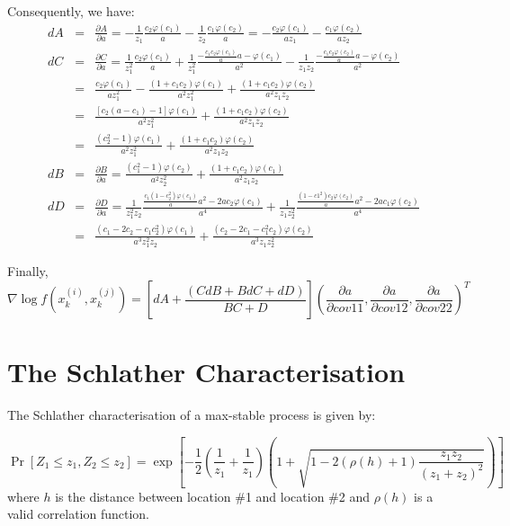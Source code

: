 \documentclass{article}
\begin{document}
Consequently, we have:
\begin{eqnarray*}
  dA &=& \frac{\partial A}{\partial a} = - \frac{1}{z_1} \frac{c_2
    \varphi(c_1)}{a} - \frac{1}{z_2} \frac{c_1 \varphi(c_2)}{a} =
  -\frac{c_2 \varphi(c_1)}{az_1} - \frac{c_1 \varphi(c_2)}{az_2}\\
  dC &=& \frac{\partial C}{\partial a} = \frac{1}{z_1^2} \frac{c_2
    \varphi(c_1)}{a} + \frac{1}{z_1^2}
  \frac{-\frac{c_1c_2\varphi(c_1)}{a} a  - \varphi(c_1)}{a^2} -
  \frac{1}{z_1z_2} \frac{-\frac{c_1c_2 \varphi(c_2)}{a}a -
    \varphi(c_2)}{a^2}\\
  &=& \frac{c_2 \varphi(c_1)}{az_1^2} -
  \frac{(1+c_1c_2)\varphi(c_1)}{a^2z_1^2} +
  \frac{(1+c_1c_2)\varphi(c_2)}{a^2z_1z_2}\\
  &=& \frac{\left[c_2(a - c_1)-1\right] \varphi(c_1)}{a^2z_1^2} +
  \frac{(1+c_1c_2)\varphi(c_2)}{a^2z_1z_2}\\
  &=& \frac{(c_2^2 - 1) \varphi(c_1)}{a^2z_1^2} +
  \frac{(1+c_1c_2)\varphi(c_2)}{a^2z_1z_2}\\
  dB &=& \frac{\partial B}{\partial a} = \frac{(c_1^2 - 1)
    \varphi(c_2)}{a^2z_2^2} +
  \frac{(1+c_1c_2)\varphi(c_1)}{a^2z_1z_2}\\
  dD &=& \frac{\partial D}{\partial a} = \frac{1}{z_1^2z_2}\frac{\frac{c_1(1 -
      c_2^2)\varphi(c_1)}{a}a^2 - 2a c_2\varphi(c_1)}{a^4} +
  \frac{1}{z_1z_2^2}\frac{\frac{(1-c1^2)c_2\varphi(c_2)}{a}a^2 - 2a
    c_1\varphi(c_2)}{a^4}\\
 &=& \frac{(c_1- 2 c_2 - c_1c_2^2) \varphi(c_1)}{a^3z_1^2z_2} +
 \frac{(c_2- 2 c_1 - c_1^2c_2) \varphi(c_2)}{a^3z_1z_2^2}
\end{eqnarray*}

Finally,
\begin{equation*}
  \nabla \log f(x_k^{(i)}, x_k^{(j)}) = \left[dA + \frac{(C dB + B dC
    +dD)}{BC + D} \right] \left( \frac{\partial a}{\partial cov{11}},
    \frac{\partial a}{\partial cov{12}}, \frac{\partial a}{\partial
      cov{22}} \right)^T
\end{equation*}

\section{The Schlather Characterisation}
\label{sec:schlather-char}

The Schlather characterisation of a max-stable process is given by:

\begin{equation}
  \label{eq:smith}
  \Pr[Z_1 \leq z_1, Z_2 \leq z_2] = \exp\left[-\frac{1}{2}
    \left(\frac{1}{z_1} + \frac{1}{z_1} \right) \left(1 + \sqrt{1 - 2
        (\rho(h) + 1) \frac{z_1 z_2}{(z_1 + z_2)^2}} \right) \right]
\end{equation}
where $h$ is the distance between location \#1 and location \#2 and
$\rho(h)$ is a valid correlation function.
\end{document}
